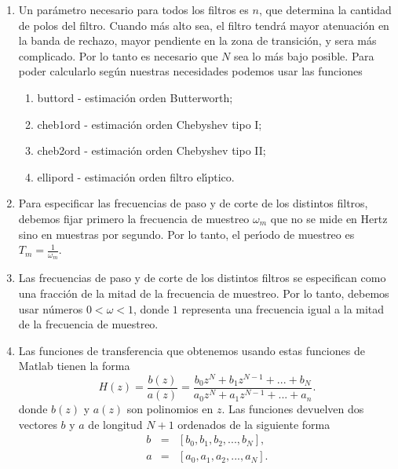 \begin{enumerate}
        \item   Un par\'{a}metro necesario para todos los filtros es $n$, que determina la cantidad de
        polos del filtro. Cuando m\'{a}s alto sea, el filtro tendr\'{a} mayor atenuaci\'{o}n en la banda
        de rechazo, mayor pendiente en la zona de transici\'{o}n, y sera m\'{a}s complicado. Por lo tanto
        es necesario que $N$ sea lo m\'{a}s bajo posible. 
        Para poder calcularlo seg\'{u}n nuestras necesidades podemos usar las funciones
        \begin{enumerate}
        
            \item   buttord     - estimaci\'{o}n orden Butterworth;
        
            \item   cheb1ord    - estimaci\'{o}n orden Chebyshev tipo I;
        
            \item   cheb2ord    - estimaci\'{o}n orden Chebyshev tipo II;
        
            \item   ellipord    - estimaci\'{o}n orden filtro el\'{\i}ptico.
        
        \end{enumerate}

        \item   Para especificar las frecuencias de paso y de corte de los distintos filtros, debemos fijar
        primero la frecuencia de muestreo $\omega_{m}$ que no se  mide en Hertz sino en muestras por
        segundo. Por lo tanto, el per\'{\i}odo de muestreo es $T_{m} = \frac{1}{\omega_{m}}$.
        
        \item   Las frecuencias de paso y de corte de los distintos filtros se especifican como una
        fracci\'{o}n de la mitad de la frecuencia de muestreo. Por lo tanto, debemos usar n\'{u}meros
        $0 < \omega < 1$, donde $1$ representa una frecuencia  igual  a la mitad de la  frecuencia  de
        muestreo.

        \item Las funciones de transferencia que obtenemos usando estas funciones de Matlab tienen la forma
        \begin{equation}
                H(z) = \frac{b(z)}{a(z)} =
                \frac{b_{0} z^{N} + b_{1} z^{N-1}+...+ b_{N}}{a_{0} z^{N} + a_{1} z^{N-1} +...+ a_{n}}.
        \end{equation}
        donde $b(z)$ y $a(z)$ son polinomios en $z$.
        Las funciones devuelven dos vectores $b$ y $a$ de longitud $N+1$  ordenados de la siguiente forma
        \begin{eqnarray}
                b &=& [b_{0}, b_{1}, b_{2},...,b_{N}],  \\
                a &=& [a_{0}, a_{1}, a_{2},...,a_{N}].
        \end{eqnarray}
       
\end{enumerate}

